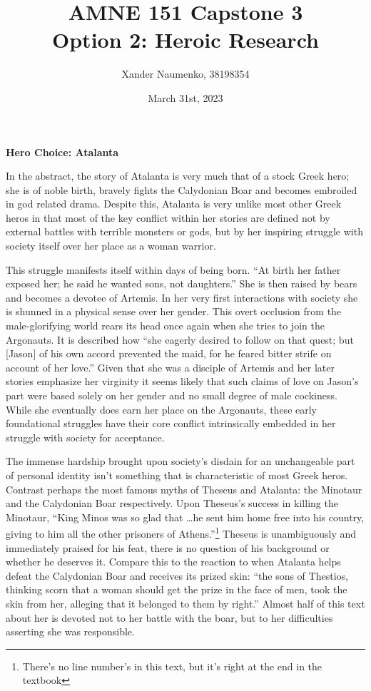 \documentclass[letterpaper, reqno,11pt]{article}
\begin{document}
\title{AMNE 151 Capstone 3\\ \large Option 2: Heroic Research}
\date{March 31st, 2023}
\author{Xander Naumenko, 38198354}
\maketitle

{\noindent\bf Hero Choice: Atalanta}

In the abstract, the story of Atalanta is very much that of a stock Greek hero; she is of noble birth, bravely fights the Calydonian Boar and becomes embroiled in god related drama. Despite this, Atalanta is very unlike most other Greek heros in that most of the key conflict within her stories are defined not by external battles with terrible monsters or gods, but by her inspiring struggle with society itself over her place as a woman warrior.

\medskip

This struggle manifests itself within days of being born. ``At birth her father exposed her; he said he wanted sons, not daughters.''\autocite{Aelian} She is then raised by bears and becomes a devotee of Artemis. In her very first interactions with society she is shunned in a physical sense over her gender. This overt occlusion from the male-glorifying world rears its head once again when she tries to join the Argonauts. It is described how ``she eagerly desired to follow on that quest; but [Jason] of his own accord prevented the maid, for he feared bitter strife on account of her love.''\autocite{Apollonius} Given that she was a disciple of Artemis and her later stories emphasize her virginity it seems likely that such claims of love on Jason's part were based solely on her gender and no small degree of male cockiness. While she eventually does earn her place on the Argonauts, these early foundational struggles have their core conflict intrinsically embedded in her struggle with society for acceptance.

\medskip

The immense hardship brought upon society's disdain for an unchangeable part of personal identity isn't something that is characteristic of most Greek heros. Contrast perhaps the most famous myths of Theseus and Atalanta: the Minotaur and the Calydonian Boar respectively. Upon Theseus's success in killing the Minotaur, ``King Minos was so glad that \ldots he sent him home free into his country, giving to him all the other prisoners of Athens.''\autocite{Plutarch}\footnote{There's no line number's in this text, but it's right at the end in the textbook} Theseus is unambiguously and immediately praised for his feat, there is no question of his background or whether he deserves it. Compare this to the reaction to when Atalanta helps defeat the Calydonian Boar and receives its prized skin: ``the sons of Thestios, thinking scorn that a woman should get the prize in the face of men, took the skin from her, alleging that it belonged to them by right.''\autocite{Bibliotheca} Almost half of this text about her is devoted not to her battle with the boar, but to her difficulties asserting she was responsible.
\end{document}
